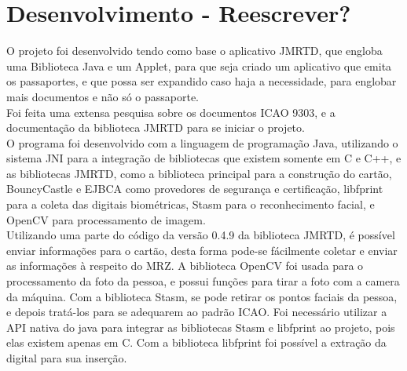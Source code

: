 \documentclass{article}
\begin{document}
	\section{Desenvolvimento - Reescrever?}
		\begin{justify}
			
		\hspace{2cm}O projeto foi desenvolvido tendo como base o aplicativo JMRTD\cite{JMRTD}, que engloba uma Biblioteca Java e um Applet, para que seja criado um aplicativo que emita os passaportes, e que possa ser expandido caso haja a necessidade, para englobar mais documentos e não só o passaporte.\\
		\hspace*{2cm}Foi feita uma extensa pesquisa sobre os documentos ICAO 9303\cite{ICAO}, e a documentação da biblioteca JMRTD para se iniciar o projeto.\\
		\hspace*{2cm}O programa foi desenvolvido com a linguagem de programação Java, utilizando o sistema JNI para a integração de bibliotecas que existem somente em C e C++, e as bibliotecas JMRTD, como a biblioteca principal para a construção do cartão, BouncyCastle\cite{BOUNCYCASTLE} e EJBCA\cite{EJBCA} como provedores de segurança e certificação, libfprint\cite{PRINT} para a coleta das digitais biométricas, Stasm\cite{STASM} para o reconhecimento facial, e OpenCV\cite{OPENCV} para processamento de imagem.\\
		\hspace*{2cm}Utilizando uma parte do código da versão 0.4.9 da biblioteca JMRTD, é possível enviar informações para o cartão, desta forma pode-se fácilmente coletar e enviar as informações à respeito do MRZ. A biblioteca OpenCV foi usada para o processamento da foto da pessoa, e possui funções para tirar a foto com a camera da máquina. Com a biblioteca Stasm, se pode retirar os pontos faciais da pessoa, e depois tratá-los para se adequarem ao padrão ICAO. Foi necessário utilizar a API nativa do java para integrar as bibliotecas Stasm e libfprint ao projeto, pois elas existem apenas em C. Com a biblioteca libfprint foi possível a extração da digital para sua inserção.

		\end{justify}
\end{document}
